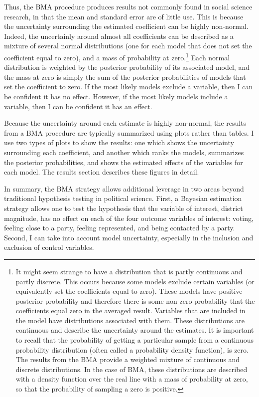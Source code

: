 \documentclass[12pt]{article}
\begin{document}
Thus, the BMA procedure produces results not commonly found in social science research, in that the mean and standard error are of little use. This is because the uncertainty surrounding the estimated coefficient can be highly non-normal. Indeed, the uncertainly around almost all coefficients can be described as a mixture of several normal distributions (one for each model that does not set the coefficient equal to zero), and a mass of probability at zero.\footnote{It might seem strange to have a distribution that is partly continuous and partly discrete. This occurs because some models exclude certain variables (or equivalently set the coefficients equal to zero). These models have positive posterior probability and therefore there is some non-zero probability that the coefficients equal zero in the averaged result. Variables that are included in the model have distributions associated with them. These distributions are continuous and describe the uncertainty around the estimates. It is important to recall that the probability of getting a particular sample from a continuous probability distribution (often called a probability density function), is zero. The results from the BMA provide a weighted mixture of continuous and discrete distributions. In the case of BMA, these distributions are described with a density function over the real line with a mass of probability at zero, so that the probability of sampling a zero is positive.} Each normal distribution is weighted by the posterior probability of its associated model, and the mass at zero is simply the sum of the posterior probabilities of models that set the coefficient to zero. If the most likely models exclude a variable, then I can be confident it has no effect. However, if the most likely models include a variable, then I can be confident it has an effect.  

Because the uncertainty around each estimate is highly non-normal, the results from a BMA procedure are typically summarized using plots rather than tables. I use two types of plots to show the results: one which shows the uncertainty surrounding each coefficient, and another which ranks the models, summarizes the posterior probabilities, and shows the estimated effects of the variables for each model. The results section describes these figures in detail.

In summary, the BMA strategy allows additional leverage in two areas beyond traditional hypothesis testing in political science. First, a Bayesian estimation strategy allows one to test the hypothesis that the variable of interest, district magnitude, has no effect on each of the four outcome variables of interest: voting, feeling close to a party, feeling represented, and being contacted by a party. Second, I can take into account model uncertainty, especially in the inclusion and exclusion of control variables. 
\end{document}
